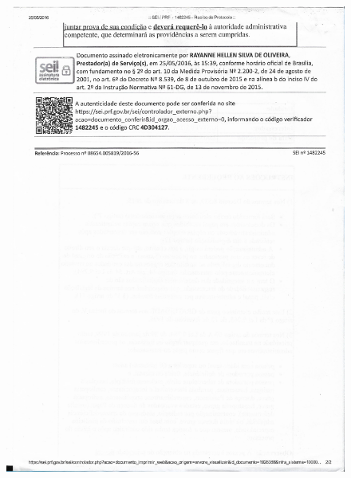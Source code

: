 \begin{figure}[ht!]
		\includegraphics[scale=0.20]{Figuras/Anexos/A1-PRFDadospg_005.pdf}
		\label{fig:Documento liberação dos dados PRF}
\end{figure}

\pagebreak


